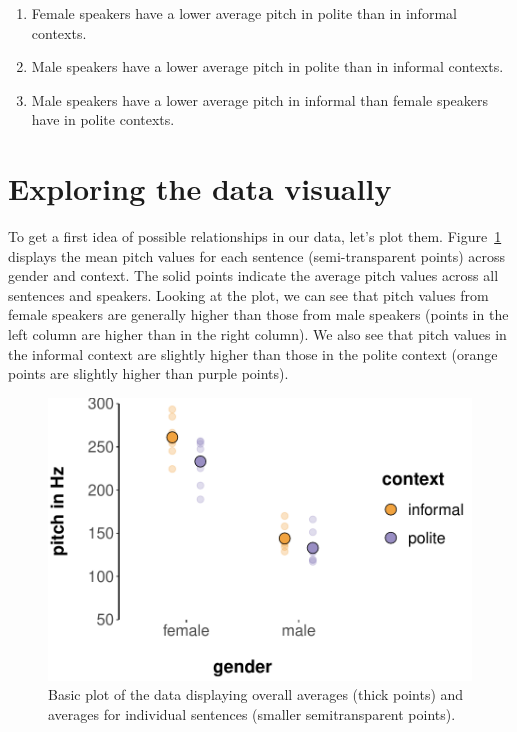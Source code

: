 \documentclass[nobib]{tufte-handout}
\begin{document}
\begin{enumerate}[{H}1:]
\item Female speakers have a lower average pitch in polite than in informal contexts.
\item Male speakers have a lower average pitch in polite than in informal contexts.
\item Male speakers have a lower average pitch in informal than female speakers have in polite contexts.
\end{enumerate}

\section{Exploring the data visually}

To get a first idea of possible relationships in our data, let's plot
them. Figure~\ref{fig:BasicPlotData_data} displays the mean pitch values for each
sentence (semi-transparent points) across gender and context. The solid points indicate the
average pitch values across all sentences and speakers. Looking at the plot, we can see that pitch values
from female speakers are generally higher than those from male speakers (points in the left column
are higher than in the right column). We also see that pitch values in the informal context are slightly higher than those in the polite context (orange points are
slightly higher than purple points).

\begin{figure}[t]
  \centering
    \includegraphics[width = \textwidth]{pics/basic_data_plot.pdf}
    \caption{Basic plot of the data displaying overall averages (thick points) and averages for individual sentences (smaller semitransparent points).}
     \label{fig:BasicPlotData_data}
\end{figure}
\end{document}

